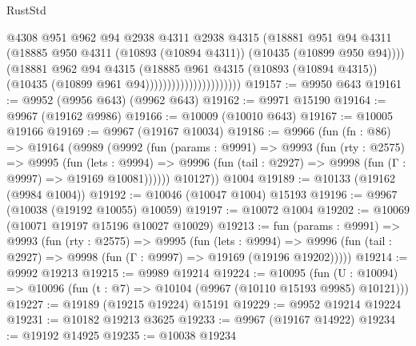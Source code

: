 \begin{lexlean}{RustStd}
\begin{coremodule}
                                        @4308
                                        @951
                                        @962
                                        @94
                                        @2938
                                        @4311
                                        @2938
                                        @4315
                                        (@18881
                                          @951
                                          @94
                                          @4311
                                          (@18885
                                            @950
                                            @4311
                                            (@10893 (@10894 @4311))
                                            (@10435 (@10899 @950 @94))))
                                        (@18881
                                          @962
                                          @94
                                          @4315
                                          (@18885
                                            @961
                                            @4315
                                            (@10893 (@10894 @4315))
                                            (@10435 (@10899 @961 @94))))))))))))))))))))))
@19157 := @9950 @643
@19161 := @9952 (@9956 @643) (@9962 @643)
@19162 := @9971 @15190
@19164 := @9967 (@19162 @9986)
@19166 := @10009 (@10010 @643)
@19167 := @10005 @19166
@19169 := @9967 (@19167 @10034)
@19186 := @9966
    (fun (fn : @86) =>
    @19164
      (@9989
        (@9992
          (fun (params : @9991) =>
          @9993
            (fun (rty : @2575) =>
            @9995
              (fun (lets : @9994) =>
              @9996 (fun (tail : @2927) => @9998 (fun (Γ : @9997) => @19169 @10081))))))
        @10127))
    @1004
@19189 := @10133 (@19162 (@9984 @1004))
@19192 := @10046 (@10047 @1004) @15193
@19196 := @9967 (@10038 (@19192 @10055) @10059)
@19197 := @10072 @1004
@19202 := @10069 (@10071 @19197 @15196 @10027 @10029)
@19213 := fun (params : @9991) =>
  @9993
    (fun (rty : @2575) =>
    @9995
      (fun (lets : @9994) =>
      @9996 (fun (tail : @2927) => @9998 (fun (Γ : @9997) => @19169 (@19196 @19202)))))
@19214 := @9992 @19213
@19215 := @9989 @19214
@19224 := @10095
    (fun (U : @10094) => @10096 (fun (t : @7) => @10104 (@9967 (@10110 @15193 @9985) @10121)))
@19227 := @19189 (@19215 @19224) @15191
@19229 := @9952 @19214 @19224
@19231 := @10182 @19213 @3625
@19233 := @9967 (@19167 @14922)
@19234 := @19192 @14925
@19235 := @10038 @19234

\end{coremodule}
\end{lexlean}
